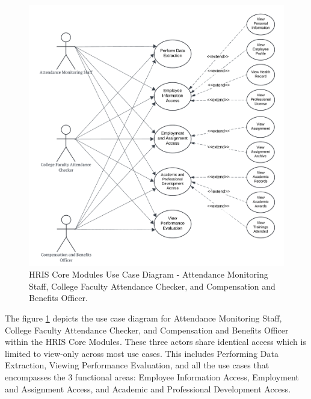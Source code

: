     \begin{figure}[H]
        \centering
        \includegraphics[width=0.9\linewidth]{figures/images/diagrams/usecase/use-case-basic-2.png}
        \caption{HRIS Core Modules Use Case Diagram - Attendance Monitoring Staff, College Faculty Attendance Checker, and Compensation and Benefits Officer.}
        \label{fig:use-case-basic-2}
    \end{figure}

    The figure \ref{fig:use-case-basic-2} depicts the use case diagram for Attendance Monitoring Staff, College Faculty Attendance Checker, and Compensation and Benefits Officer within the HRIS Core Modules. These three actors share identical access which is limited to view-only across most use cases. This includes Performing Data Extraction, Viewing Performance Evaluation, and all the use cases that encompasses the 3 functional areas: Employee Information Access, Employment and Assignment Access, and Academic and Professional Development Access. 

